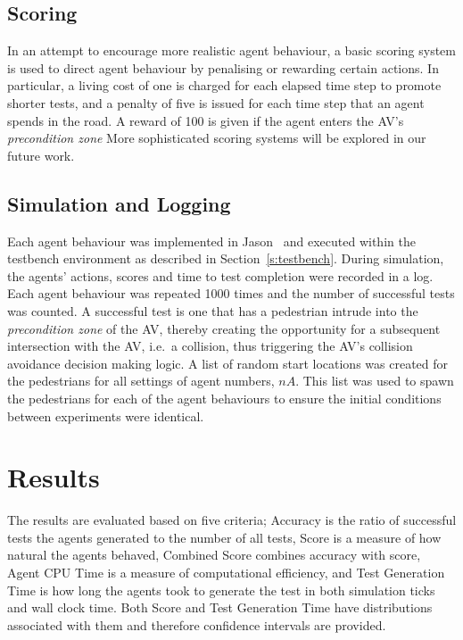 \documentclass[runningheads,a4paper]{llncs}
\begin{document}
\subsection{Scoring}

In an attempt to encourage more realistic agent behaviour, a basic scoring system is used to direct agent behaviour by penalising or rewarding certain actions. In particular, a living cost of one is charged for each elapsed time step to promote shorter tests, and a penalty of five is issued for each time step that  an agent spends in the road. A reward of 100 is given if the agent enters the AV's \textit{precondition zone} More sophisticated scoring systems will be explored in our future work. 

\subsection{Simulation and Logging}

Each agent behaviour was implemented in Jason~\cite{bordini2005jason} and executed within the testbench environment as described in Section~\ref{s:testbench}.
During simulation, the agents' actions, scores and time to test completion were recorded in a log. Each agent behaviour was repeated 1000 times and the number of successful tests was counted. A successful test is one that has a pedestrian intrude into the \textit{precondition zone} of the AV, thereby creating the opportunity for a subsequent intersection with the AV, i.e.\ a collision, thus triggering the AV's collision avoidance decision making logic. A list of random start locations was created for the pedestrians for all settings of agent numbers, $nA$. This list was used to spawn the pedestrians for each of the agent behaviours to ensure the initial conditions between experiments were identical. 

\section{Results}\label{s:results}
The results are evaluated based on five criteria; Accuracy is the ratio of successful tests the agents generated to the number of all tests, Score is a measure of how natural the agents behaved, Combined Score combines accuracy with score, Agent CPU Time is a measure of computational efficiency, and Test Generation Time is how long the agents took to generate the test in both simulation ticks and wall clock time. Both Score and Test Generation Time have distributions associated with them and therefore confidence intervals are provided.
\end{document}
